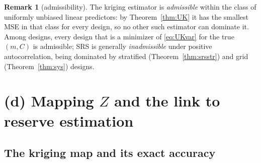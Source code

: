 \documentclass{amsart}
\theoremstyle{definition}
\newtheorem{remark}[theorem]{Remark}
\begin{document}
\begin{remark}[admissibility]
The kriging estimator is \emph{admissible} within the class of uniformly
unbiased linear predictors: by Theorem~\ref{thm:UK} it has the smallest MSE
in that class for every design, so no other such estimator can dominate it.
Among designs, every design that is a minimizer of \eqref{eq:UKvar} for the
true $(m,C)$ is admissible; SRS is generally \emph{inadmissible} under
positive autocorrelation, being dominated by stratified
(Theorem~\ref{thm:srsstr}) and grid (Theorem~\ref{thm:sys}) designs.
\end{remark}

\section{(d) Mapping $Z$ and the link to reserve estimation}
\label{sec:map}

\subsection{The kriging map and its exact accuracy}
\end{document}

